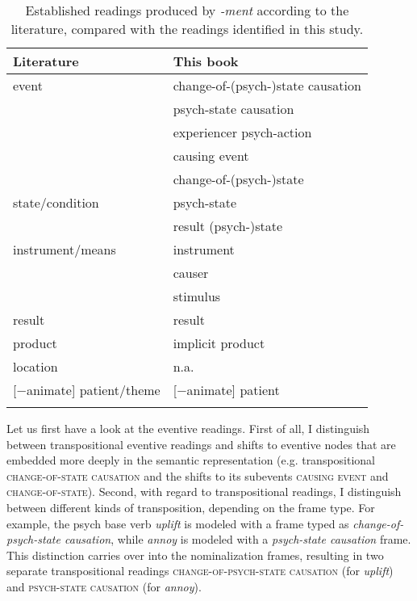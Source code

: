 \begin{table}[t]
\caption{Established readings produced by \textit{-ment} according to the literature, compared with the readings identified in this study.}
\label{tab:ReadingsComparison}
\begin{tabular}{ll}
\lsptoprule
Literature                & This book                    \\
\midrule
 event      & change-of-(psych-)state causation \\
                          & psych-state causation             \\
                          & experiencer psych-action          \\
                          & causing event                     \\
                          & change-of-(psych-)state           \\
state/condition           & psych-state                       \\
                          & result (psych-)state              \\
instrument/means          & instrument     \\
						& causer \\
						& stimulus \\
result                    & result                            \\
product                   & implicit product                  \\
location                  & n.a.                                 \\
 {[−animate]} patient/theme & [−animate] patient                \\
\lspbottomrule
\end{tabular}
\end{table}

Let us first have a look at the eventive readings.
First of all, I distinguish between transpositional eventive readings and shifts to eventive nodes that are embedded more deeply in the semantic representation (e.g. transpositional \textsc{change-of-state causation} and the shifts to its subevents \textsc{causing event} and \textsc{change-of-state}).
Second, with regard to transpositional readings, I distinguish between different kinds of transposition, depending on the frame type. For example, the psych base verb \textit{uplift} is modeled with a frame typed as \textit{change-of-psych-state causation}, while \textit{annoy} is modeled with a \textit{psych-state causation} frame. This distinction carries over into the nominalization frames, resulting in two separate transpositional readings \textsc{change-of-psych-state causation} (for \textit{uplift}) and \textsc{psych-state causation} (for \textit{annoy}). 


